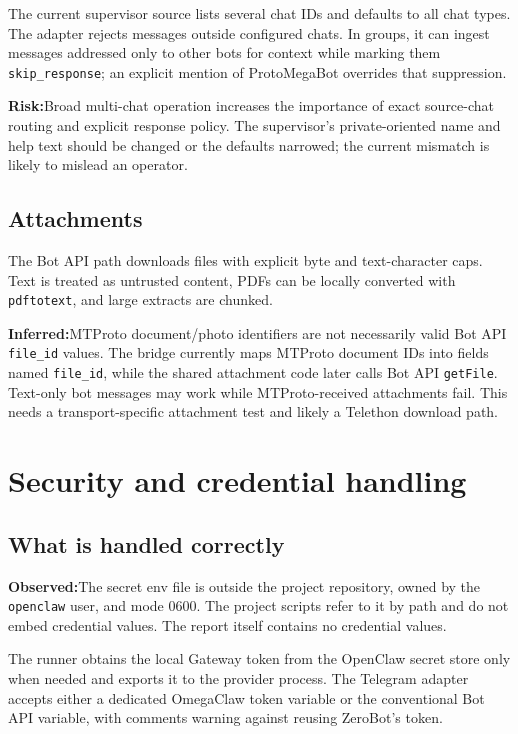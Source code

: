 \documentclass[10pt]{article}
\newcommand{\code}[1]{\texttt{#1}}
\newcommand{\observed}{\textbf{Observed:}}
\newcommand{\inferred}{\textbf{Inferred:}}
\newcommand{\risk}{\textbf{Risk:}}
\begin{document}
The current supervisor source lists several chat IDs and defaults to all chat types. The adapter rejects messages outside configured chats. In groups, it can ingest messages addressed only to other bots for context while marking them \code{skip\_response}; an explicit mention of ProtoMegaBot overrides that suppression.

\risk Broad multi-chat operation increases the importance of exact source-chat routing and explicit response policy. The supervisor's private-oriented name and help text should be changed or the defaults narrowed; the current mismatch is likely to mislead an operator.

\subsection{Attachments}

The Bot API path downloads files with explicit byte and text-character caps. Text is treated as untrusted content, PDFs can be locally converted with \code{pdftotext}, and large extracts are chunked.

\inferred MTProto document/photo identifiers are not necessarily valid Bot API \code{file\_id} values. The bridge currently maps MTProto document IDs into fields named \code{file\_id}, while the shared attachment code later calls Bot API \code{getFile}. Text-only bot messages may work while MTProto-received attachments fail. This needs a transport-specific attachment test and likely a Telethon download path.

\section{Security and credential handling}

\subsection{What is handled correctly}

\observed The secret env file is outside the project repository, owned by the \code{openclaw} user, and mode 0600. The project scripts refer to it by path and do not embed credential values. The report itself contains no credential values.

The runner obtains the local Gateway token from the OpenClaw secret store only when needed and exports it to the provider process. The Telegram adapter accepts either a dedicated OmegaClaw token variable or the conventional Bot API variable, with comments warning against reusing ZeroBot's token.
\end{document}
